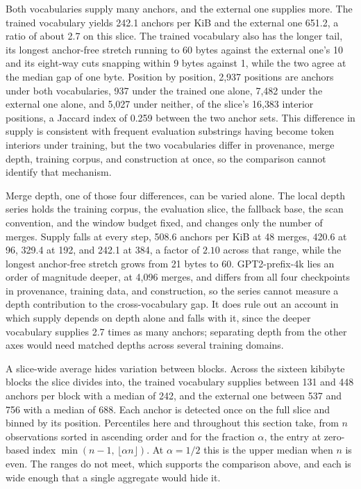 \documentclass[11pt,a4paper]{article}
\theoremstyle{definition}
\theoremstyle{plain}
\begin{document}
Both vocabularies supply many anchors, and the external one supplies more. The trained vocabulary yields 242.1 anchors
per KiB and the external one 651.2, a ratio of about 2.7 on this slice. The trained vocabulary also has the longer tail,
its longest anchor-free stretch running to 60 bytes against the external one's 10 and its eight-way cuts snapping within
9 bytes against 1, while the two agree at the median gap of one byte. Position by position, 2{,}937 positions are
anchors under both vocabularies, 937 under the trained one alone, 7{,}482 under the external one alone, and 5{,}027
under neither, of the slice's 16{,}383 interior positions, a Jaccard index of 0.259 between the two anchor sets. This
difference in supply is consistent with frequent evaluation substrings having become token interiors under training, but
the two vocabularies differ in provenance, merge depth, training corpus, and construction at once, so the comparison
cannot identify that mechanism.

Merge depth, one of those four differences, can be varied alone. The local depth series holds the training corpus, the
evaluation slice, the fallback base, the scan convention, and the window budget fixed, and changes only the number of
merges. Supply falls at every step, 508.6 anchors per KiB at 48 merges, 420.6 at 96, 329.4 at 192, and 242.1 at 384, a
factor of $2.10$ across that range, while the longest anchor-free stretch grows from 21 bytes to 60. GPT2-prefix-4k lies
an order of magnitude deeper, at 4{,}096 merges, and differs from all four checkpoints in provenance, training data, and
construction, so the series cannot measure a depth contribution to the cross-vocabulary gap. It does rule out an account
in which supply depends on depth alone and falls with it, since the deeper vocabulary supplies 2.7 times as many
anchors; separating depth from the other axes would need matched depths across several training domains.

A slice-wide average hides variation between blocks. Across the sixteen kibibyte blocks the slice divides into, the
trained vocabulary supplies between 131 and 448 anchors per block with a median of 242, and the external one between 537
and 756 with a median of 688. Each anchor is detected once on the full slice and binned by its position. Percentiles
here and throughout this section take, from $n$ observations sorted in ascending order and for the fraction $\alpha$,
the entry at zero-based index $\min(n - 1,\, \lfloor \alpha n \rfloor)$. At $\alpha = 1/2$ this is the upper median when
$n$ is even. The ranges do not meet, which supports the comparison above, and each is wide enough that a single
aggregate would hide it.
\end{document}
